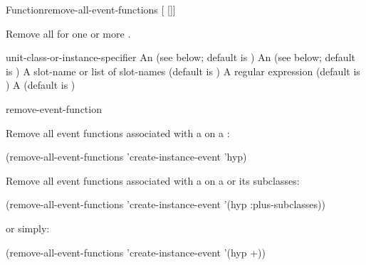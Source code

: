 \documentclass[10pt,twoside,english,pdftex]{article}
\begin{document}
\begin{functiondoc}{Function}{remove-all-event-functions}%
{[ 
[]] \\
 }
%


\fnsyntax

\fnpurpose Remove all  for one or more .

\fnpackage {}

\fnmodule {}

\fnargs
\begin{args}{unit-class-or-instance-specifier}
 An  
(see below; default is )
 An 
(see below; default is )
 A slot-name or list of slot-names
(default is )
 A  regular expression
(default is \code{(*)})
\arg[permanent] A  (default is \nil)
\end{args}

\fndsyntax
\W\supp\tabletop
\eventclassspec
\subeventingspec
\syntaxsep
\unitclassinstancespec
\subclassingspec

\begin{alsos}{remove-event-function}
\end{alsos}

\fnexamples
{}%
Remove all event functions associated with a
 on a  :
%
\W\supp
\begin{example}
  (remove-all-event-functions 'create-instance-event 'hyp)
\end{example}
%
Remove all event functions associated with a
 on a   or
its subclasses:
%
\W\supp\notpretop
\begin{example}
  (remove-all-event-functions 'create-instance-event '(hyp :plus-subclasses))
\end{example}
%
or simply:
%
\W\supp\notpretop
\begin{example}
  (remove-all-event-functions 'create-instance-event '(hyp +))
\end{example}

\fnnote
\instanceevfnsnyi

\end{functiondoc}
\end{document}
